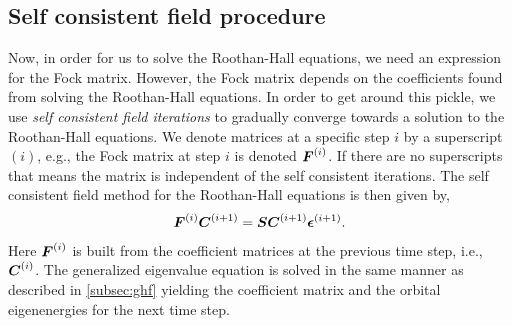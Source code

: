         \subsection{Self consistent field procedure}
            Now, in order for us to solve the Roothan-Hall equations, we need an
            expression for the Fock matrix.
            However, the Fock matrix depends on the coefficients found from
            solving the Roothan-Hall equations.
            In order to get around this pickle, we use \emph{self consistent
            field iterations} to gradually converge towards a solution to the
            Roothan-Hall equations.
            We denote matrices at a specific step $i$ by a superscript $(i)$,
            e.g., the Fock matrix at step $i$ is denoted $\boldsymbol{F}^{(i)}$.
            If there are no superscripts that means the matrix is independent of
            the self consistent iterations.
            The self consistent field method for the Roothan-Hall equations is
            then given by,
            \begin{align}
                \boldsymbol{F}^{(i)}\boldsymbol{C}^{(i + 1)}
                = \boldsymbol{S} \boldsymbol{C}^{(i + 1)}\boldsymbol{\epsilon}^{(i + 1)}.
                \label{eq:ghf-scf-roothan-hall}
            \end{align}
            Here $\boldsymbol{F}^{(i)}$ is built from the coefficient matrices at the
            previous time step, i.e., $\boldsymbol{C}^{(i)}$.
            The generalized eigenvalue equation is solved in the same manner as
            described in \autoref{subsec:ghf} yielding the coefficient matrix
            and the orbital eigenenergies for the next time step.

